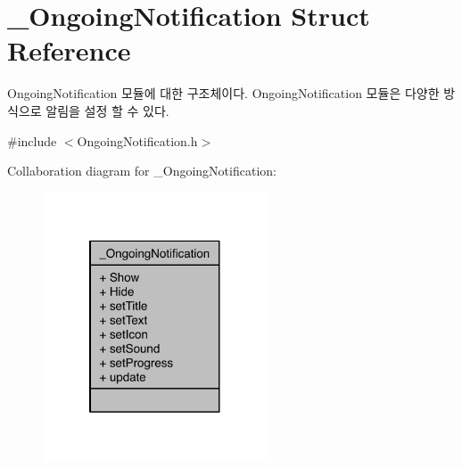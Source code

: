 \hypertarget{struct__OngoingNotification}{\section{\-\_\-\-Ongoing\-Notification Struct Reference}
\label{struct__OngoingNotification}
}


Ongoing\-Notification 모듈에 대한 구조체이다. Ongoing\-Notification 모듈은 다양한 방식으로 알림을 설정 할 수 있다.  




{\ttfamily \#include $<$Ongoing\-Notification.\-h$>$}



Collaboration diagram for \-\_\-\-Ongoing\-Notification\-:\nopagebreak
\begin{figure}[H]
\begin{center}
\leavevmode
\includegraphics[width=188pt]{d2/da1/struct__OngoingNotification__coll__graph}
\end{center}
\end{figure}
